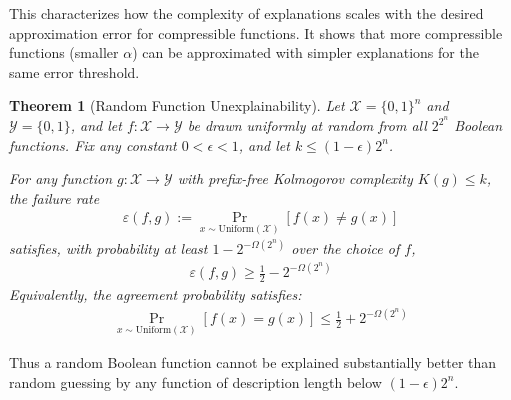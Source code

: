 \documentclass[11pt,letter,leqno]{article}
\newtheorem{theorem}{Theorem}[section]
\begin{document}
This characterizes how the complexity of explanations scales with the desired approximation error for compressible functions.  It shows that more compressible functions (smaller $\alpha$) can be approximated with simpler explanations for the same error threshold.

\begin{theorem}[Random Function Unexplainability]
\label{thm:random-unexplainability}
Let $\mathcal{X} = \{0,1\}^n$ and $\mathcal{Y} = \{0,1\}$, and let $f : \mathcal{X} \to \mathcal{Y}$ be drawn uniformly at random from all $2^{2^n}$ Boolean functions. Fix any constant $0 < \epsilon < 1$, and let $k \leq (1-\epsilon)2^n$.

For any function $g : \mathcal{X} \to \mathcal{Y}$ with prefix-free Kolmogorov complexity $K(g) \leq k$, the \emph{failure rate}
\begin{align}
\varepsilon(f,g) := \Pr_{x \sim \text{Uniform}(\mathcal{X})}[f(x) \neq g(x)]
\end{align}
satisfies, with probability at least $1 - 2^{-\Omega(2^n)}$ over the choice of $f$,
\begin{align}
\varepsilon(f,g) \geq \frac{1}{2} - 2^{-\Omega(2^n)}
\end{align}
Equivalently, the agreement probability satisfies:
\begin{align}
\Pr_{x \sim \text{Uniform}(\mathcal{X})}[f(x) = g(x)] \leq \frac{1}{2} + 2^{-\Omega(2^n)}
\end{align}

\end{theorem}

Thus a random Boolean function cannot be explained substantially better than
random guessing by any function of description length below $(1-\epsilon)2^n$.
\end{document}
